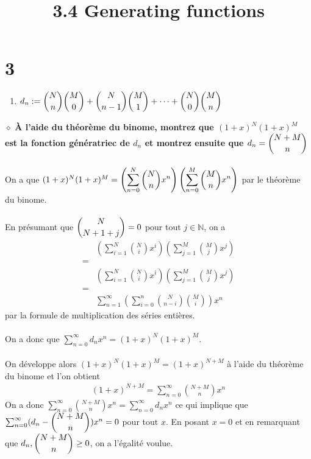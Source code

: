 \documentclass[a4paper,10pt]{article}
\title{3.4 Generating functions}
\begin{document}
\maketitle

\section*{3}
\begin{enumerate}
	\item $d_n := \dbinom{N}{n} \dbinom{M}{0} + \dbinom{N}{n-1} \dbinom{M}{1} + \cdots  + \dbinom{N}{0} \dbinom{M}{n}$
\end{enumerate}
$\diamond$ \textbf{À l'aide du théorème du binome, montrez que $(1+x)^N (1+x)^M$ est la fonction génératriec de $d_n$ et montrez ensuite que $d_n = \dbinom{N+M}{n}$}
\\
\\
On a que $(1+x)^N (1+x)^M = \left(\displaystyle\sum_{n=0}^N \dbinom{N}{n} x^{n}\right)\left(\displaystyle\sum_{n=0}^M \dbinom{M}{n}x^{n}\right)$ par le théorème du binome.
\\
\\
En présumant que $\dbinom{N}{N+1+j} = 0$ pour tout $j \in \mathbb{N}$, on a
\begin{align*}
	& \left(\sum_{i=1}^N \binom{N}{i}x^i \right)\left(\sum_{j=1}^M \binom{M}{j}x^j\right) \\
	= \\
	& \left(\sum_{i=1}^N \binom{N}{i}x^i \right)\left(\sum_{j=1}^M \binom{M}{j}x^j\right) \\
	= \\
	& \sum_{n=1}^\infty \left(\sum_{i=0}^n \binom{N}{n-i} \binom{M}{i}\right) x^n
\end{align*}
par la formule de multiplication des séries entières.
\\
\\
On a donc que $\sum_{n=0}^\infty d_n x^n = (1+x)^N (1+x)^M$. 
\\
\\
On développe alors $(1+x)^N (1+x)^M = (1+x)^{N+M}$ à l'aide du théorème du binome et l'on obtient
\begin{align*}
	(1+x)^{N+M} = \sum_{n=0}^\infty \binom{N+M}{n} x^n
\end{align*}
On a donc $\sum_{n=0}^\infty \binom{N+M}{n} x^n = \sum_{n=0}^\infty d_n x^n$ ce qui implique que $\sum_{n=0}^\infty (d_n - \dbinom{N+M}{n}) x^n = 0$ pour tout $x$. En posant $x = 0$ et en remarquant que $d_n, \dbinom{N+M}{n} \geq 0$, on a l'égalité voulue.
\end{document}
